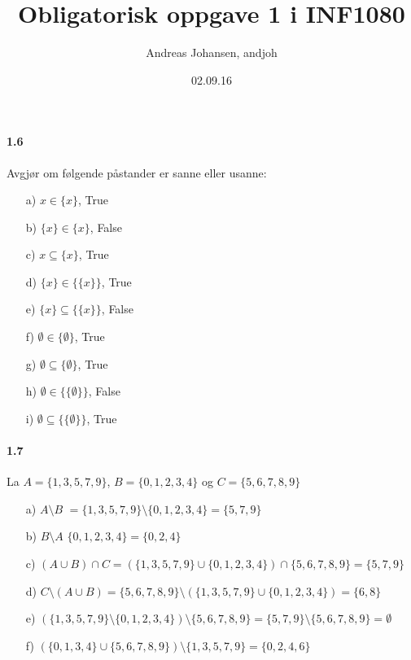 \documentclass[12pt, norsk, a4paper]{article}
\begin{document}
\title{Obligatorisk oppgave 1 i INF1080}
\author{Andreas Johansen, andjoh}
\date{02.09.16}
\maketitle

\paragraph*{1.6}
Avgjør om følgende påstander er sanne eller usanne:
\begin{itemize}
\item[a)] $x \in \{x\}$, True
\item[b)] $\{x\} \in \{x\}$, False
\item[c)] ${x} \subseteq \{x\}$, True
\item[d)] $\{x\} \in \{\{x\}\}$, True
\item[e)] $\{x\} \subseteq \{\{x\}\}$, False
\item[f)] $\emptyset \in \{\emptyset\}$, True
\item[g)] $\emptyset \subseteq \{\emptyset\}$, True
\item[h)] $\emptyset \in \{\{\emptyset\}\}$, False
\item[i)] $\emptyset \subseteq \{\{\emptyset\}\}$, True
\end{itemize}

\paragraph*{1.7} La $A = \{1, 3, 5, 7, 9\}$, $B = \{0, 1, 2, 3, 4\}$ og $C = \{5, 6, 7, 8, 9\}$
\begin{itemize}
\item[a)] $A \setminus B$ $= \{1, 3, 5, 7, 9\} \setminus \{0, 1, 2, 3, 4\} = \{5, 7, 9\}$

\item[b)] $B \setminus A$ $\{0, 1, 2, 3, 4\} = \{0, 2, 4\}$

\item[c)] $(A \cup B) \cap C = (\{1, 3, 5, 7, 9\} \cup \{0, 1, 2, 3, 4\}) \cap \{5, 6, 7, 8, 9\} = \{5, 7, 9\}$

\item[d)] $C \setminus (A \cup B) = \{5, 6, 7, 8, 9\}\setminus(\{1, 3, 5, 7, 9\} \cup \{0, 1, 2, 3, 4\}) = \{6, 8\}$

\item[e)] $(\{1, 3, 5, 7, 9\} \setminus \{0, 1, 2, 3, 4\}) \setminus \{5, 6, 7, 8, 9\} = \{5, 7, 9\} \setminus \{5, 6, 7, 8, 9\} = \emptyset$

\item[f)] $(\{0, 1, 3, 4\} \cup \{5, 6, 7, 8, 9\}) \setminus \{1, 3, 5, 7, 9\} = \{0, 2, 4, 6\}$
\end{itemize}
\end{document}

